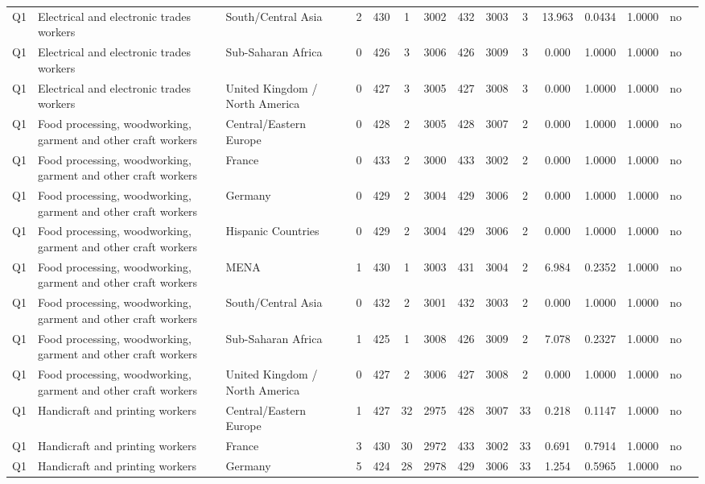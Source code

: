 \begin{longtable}{lllrcccccccccll}
Q1 & Electrical and electronic trades workers & South/Central Asia & 2 & 430 & 1 & 3002 & 432 & 3003 & 3 & 13.963 & 0.0434 & 1.0000 & no \\
Q1 & Electrical and electronic trades workers & Sub-Saharan Africa & 0 & 426 & 3 & 3006 & 426 & 3009 & 3 & 0.000 & 1.0000 & 1.0000 & no \\
Q1 & Electrical and electronic trades workers & United Kingdom / North America & 0 & 427 & 3 & 3005 & 427 & 3008 & 3 & 0.000 & 1.0000 & 1.0000 & no \\
Q1 & Food processing, woodworking, garment and other craft workers & Central/Eastern Europe & 0 & 428 & 2 & 3005 & 428 & 3007 & 2 & 0.000 & 1.0000 & 1.0000 & no \\
Q1 & Food processing, woodworking, garment and other craft workers & France & 0 & 433 & 2 & 3000 & 433 & 3002 & 2 & 0.000 & 1.0000 & 1.0000 & no \\
Q1 & Food processing, woodworking, garment and other craft workers & Germany & 0 & 429 & 2 & 3004 & 429 & 3006 & 2 & 0.000 & 1.0000 & 1.0000 & no \\
Q1 & Food processing, woodworking, garment and other craft workers & Hispanic Countries & 0 & 429 & 2 & 3004 & 429 & 3006 & 2 & 0.000 & 1.0000 & 1.0000 & no \\
Q1 & Food processing, woodworking, garment and other craft workers & MENA & 1 & 430 & 1 & 3003 & 431 & 3004 & 2 & 6.984 & 0.2352 & 1.0000 & no \\
Q1 & Food processing, woodworking, garment and other craft workers & South/Central Asia & 0 & 432 & 2 & 3001 & 432 & 3003 & 2 & 0.000 & 1.0000 & 1.0000 & no \\
Q1 & Food processing, woodworking, garment and other craft workers & Sub-Saharan Africa & 1 & 425 & 1 & 3008 & 426 & 3009 & 2 & 7.078 & 0.2327 & 1.0000 & no \\
Q1 & Food processing, woodworking, garment and other craft workers & United Kingdom / North America & 0 & 427 & 2 & 3006 & 427 & 3008 & 2 & 0.000 & 1.0000 & 1.0000 & no \\
Q1 & Handicraft and printing workers & Central/Eastern Europe & 1 & 427 & 32 & 2975 & 428 & 3007 & 33 & 0.218 & 0.1147 & 1.0000 & no \\
Q1 & Handicraft and printing workers & France & 3 & 430 & 30 & 2972 & 433 & 3002 & 33 & 0.691 & 0.7914 & 1.0000 & no \\
Q1 & Handicraft and printing workers & Germany & 5 & 424 & 28 & 2978 & 429 & 3006 & 33 & 1.254 & 0.5965 & 1.0000 & no \\

\end{longtable}
